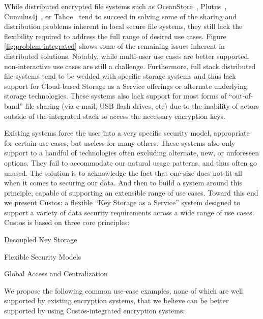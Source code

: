 While distributed encrypted file systems such as
OceanStore~\cite{Kubiatowicz2000}, Plutus~\cite{Kallahalla2003},
Cumulus4j~\cite{cumulus4j}, or Tahoe~\cite{Wilcox-O'Hearn2008} tend to
succeed in solving some of the sharing and distribution problems
inherent in local secure file systems, they still lack the flexibility
required to address the full range of desired use cases. Figure
\ref{fig:problem-integrated} shows some of the remaining issues
inherent in distributed solutions. Notably, while multi-user use cases
are better supported, non-interactive use cases are still a
challenge. Furthermore, full stack distributed file systems tend to be
wedded with specific storage systems and thus lack support for
Cloud-based Storage as a Service offerings or alternate underlying
storage technologies. These systems also lack support for most forms
of ``out-of-band'' file sharing (via e-mail, USB flash drives, etc)
due to the inability of actors outside of the integrated stack to
access the necessary encryption keys.

Existing systems force the user into a very specific security model,
appropriate for certain use cases, but useless for many others. These
systems also only support to a handful of technologies often excluding
alternate, new, or unforeseen options. They fail to accommodate our
natural usage patterns, and thus often go unused. The solution is to
acknowledge the fact that one-size-does-not-fit-all when it comes to
securing our data. And then to build a system around this principle,
capable of supporting an extensible range of use cases. Toward this
end we present Custos: a flexible ``Key Storage as a Service'' system
designed to support a variety of data security requirements across a
wide range of use cases. Custos is based on three core principles:

\begin{packed_item}
\item Decoupled Key Storage
\item Flexible Security Models
\item Global Access and Centralization
\end{packed_item}

We propose the following common use-case examples, none of which are
well supported by existing encryption systems, that we believe can be
better supported by using Custos-integrated encryption systems:

